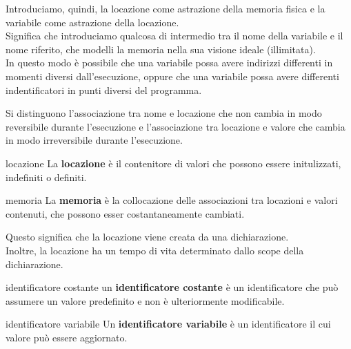 Introduciamo, quindi, la locazione come astrazione della memoria fisica e la variabile come astrazione della locazione.\\[0.2ex]
Significa che introduciamo qualcosa di intermedio tra il nome della variabile e il nome riferito, che modelli la memoria nella sua visione ideale (illimitata).\\[0.2ex]
In questo modo è possibile che una variabile possa avere indirizzi differenti in momenti diversi dall'esecuzione, oppure che una variabile possa avere differenti indentificatori in punti diversi del programma.

Si distinguono l'associazione tra nome e locazione che non cambia in modo reversibile durante l'esecuzione e l'associazione tra locazione e valore che cambia in modo irreversibile durante l'esecuzione.

\begin{mydef}{locazione}
    La \textbf{locazione} è il contenitore di valori che possono essere initulizzati, indefiniti o definiti.
\end{mydef}

\begin{mydef}{memoria}
    La \textbf{memoria} è la collocazione delle associazioni tra locazioni e valori contenuti, che possono esser costantaneamente cambiati.
\end{mydef}

Questo significa che la locazione viene creata da una dichiarazione.\\[0.2ex]
Inoltre, la locazione ha un tempo di vita determinato dallo scope della dichiarazione.

\begin{mydef}{identificatore costante}
    un \textbf{identificatore costante} è un identificatore che può assumere un valore predefinito e non è ulteriormente modificabile.
\end{mydef}

\begin{mydef}{identificatore variabile}
    Un \textbf{identificatore variabile} è un identificatore il cui valore può essere aggiornato.
\end{mydef}